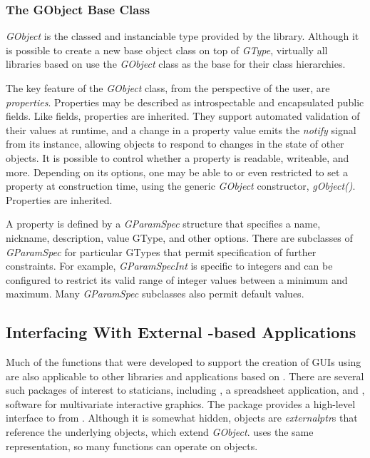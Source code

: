 \documentclass[article]{jss}
\begin{document}
\subsubsection{The GObject Base Class}

\emph{GObject} is the classed and instanciable type provided by the 
library. Although it is possible to create a new base object class on top of
\emph{GType}, virtually all libraries based on  use the 
\emph{GObject} class as the base for their class hierarchies. 

The key feature of the \emph{GObject} class, from the perspective of the 
 user, are \emph{properties}. Properties may be described as 
introspectable and encapsulated public fields. Like fields, properties are 
inherited. They support automated validation 
of their values at runtime, and a change in a property value emits the 
\emph{notify} signal from its instance, allowing objects to respond
to changes in the state of other objects. It is possible to control whether a 
property is readable, writeable, and more. Depending on its options,
one may be able to or even restricted to set a property at construction time, 
using the generic \emph{GObject} constructor, \emph{gObject()}. Properties are 
inherited.

A property is defined by a \emph{GParamSpec} structure that specifies a name, 
nickname, description, value GType, and other options. There are subclasses of 
\emph{GParamSpec} for particular GTypes that permit specification of further 
constraints. For example, \emph{GParamSpecInt} is specific to integers and can be
configured to restrict its valid range of integer values between a minimum and maximum.
Many \emph{GParamSpec} subclasses also permit default values.

\subsection[Interfacing With External GObject-based Applications]{Interfacing With External -based Applications}

Much of the  functions that were developed to support the
creation of GUIs using  are also applicable to other libraries
and applications based on . There are several such packages of
interest to staticians, including , a spreadsheet application, and
, software for multivariate interactive graphics. The 
package \citep{rggobi} provides a high-level interface to  from 
. Although it is somewhat hidden,  objects are 
\emph{externalptr}s that reference the underlying  objects, which
extend \emph{GObject}.  uses the same  representation, so
many  functions can operate on  objects.
\end{document}
